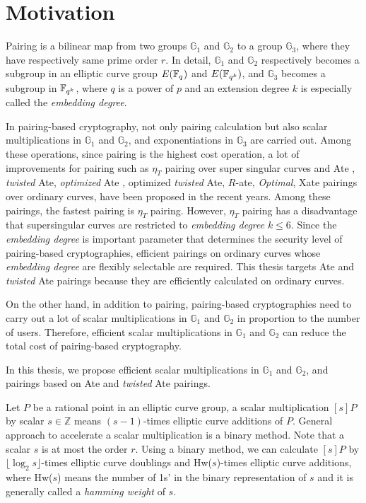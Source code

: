 \section{Motivation}
Pairing is a bilinear map from two groups $\mathbb{G}_1$ and $\mathbb{G}_2$ to a group $\mathbb{G}_3$, where they have respectively same prime order $r$.
In detail, $\mathbb{G}_1$ and $\mathbb{G}_2$ respectively becomes a subgroup in an elliptic curve group $E({\mathbb{F}}_{q^{}})$ and $E({\mathbb{F}}_{q^{k}})$, and $\mathbb{G}_3$ becomes a subgroup in ${\mathbb{F}}_{q^{k}}$, where $q$ is a power of $p$ and an extension degree $k$ is especially called the {\it embedding degree}.
 
In pairing-based cryptography, not only pairing calculation but also scalar multiplications in $\mathbb{G}_1$ and $\mathbb{G}_2$, and exponentiations in $\mathbb{G}_3$ are carried out.
Among these operations, since pairing is the highest cost operation, a lot of improvements for pairing such as $\eta_T$ pairing over super singular curves and Ate \cite{Hess}, {\it twisted} Ate\cite{Hess}, {\it optimized} Ate \cite{TAte}, optimized {\it twisted} Ate\cite{TAte}, $R$-ate\cite{Rate}, {\it Optimal}\cite{OptAte}, Xate \cite{Xate} pairings over ordinary curves, have been proposed in the recent years.
Among these pairings, the fastest pairing is $\eta_T$ pairing.
However, $\eta_T$ pairing has a disadvantage that supersingular curves are restricted to {\it embedding degree} $k\leq6$. 
Since the {\it embedding degree} is important parameter that determines the security level of pairing-based cryptographies, efficient pairings on ordinary curves whose {\it embedding degree} are flexibly selectable are required.
This thesis targets Ate and {\it twisted} Ate pairings because they are efficiently calculated on ordinary curves.
  
On the other hand, in addition to pairing, pairing-based cryptographies need to carry out a lot of scalar multiplications in $\mathbb{G}_1$ and $\mathbb{G}_2$ in proportion to the number of users.
Therefore, efficient scalar multiplications in $\mathbb{G}_1$ and $\mathbb{G}_2$ can reduce the total cost of pairing-based cryptography.

In this thesis, we propose efficient scalar multiplications in $\mathbb{G}_1$ and $\mathbb{G}_2$, and pairings based on Ate and {\it twisted} Ate pairings.

Let $P$ be a rational point in an elliptic curve group, a scalar multiplication $[s]P$ by scalar $s\in{\mathbb Z}$ means $(s-1)$-times elliptic curve additions of $P$.
General approach to accelerate a scalar multiplication is a binary method.
Note that a scalar $s$ is at most the order $r$.
Using a binary method, we can calculate $[s]P$ by $\lfloor \log_2 s \rfloor$-times elliptic curve doublings and Hw($s$)-times elliptic curve additions, where Hw($s$) means the number of 1s' in the binary representation of $s$ and it is generally called a {\it hamming weight} of $s$.  

